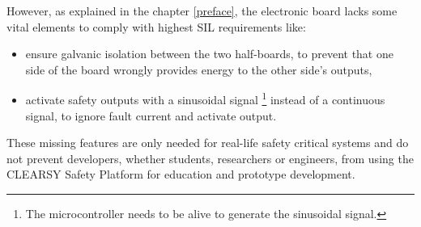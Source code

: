  However, as explained in the chapter \ref{preface}, the electronic board lacks some vital elements to comply with highest SIL requirements like:
 \begin{itemize}
     \item ensure galvanic isolation between the two half-boards, to prevent that one side of the board wrongly provides energy to the other side's outputs,
     \item activate safety outputs with a sinusoidal signal \footnote{The microcontroller needs to be alive to generate the sinusoidal signal.} instead of a continuous signal, to ignore fault current and activate output.
 \end{itemize}
These missing features are only needed for real-life safety critical systems and do not prevent developers, whether students, researchers or engineers, from using the CLEARSY Safety Platform for education and prototype development. 

